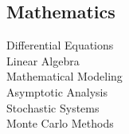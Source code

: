 \documentclass[letterpaper]{deedy-resume} %
\begin{document}
\begin{minipage}[t]{0.33\textwidth}
        \sectionspace %

    \subsection{Mathematics}

        \textbullet{} Differential Equations \\
        \textbullet{} Linear Algebra \\
        \textbullet{} Mathematical Modeling \\
        \textbullet{} Asymptotic Analysis \\
        \textbullet{} Stochastic Systems \\
        \textbullet{} Monte Carlo Methods \\

    \sectionspace %



\end{minipage} %
\hfill
%
%
\end{document}
